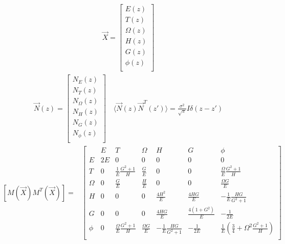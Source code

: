 \begin{align}
\vec{X} = \left[\begin{array}{c}
E(z) \\ 
T(z) \\
\Omega(z)\\
H(z) \\
G(z) \\ 
\phi(z) \\
\end{array}\right]
 \end{align}
\begin{align}
\vec{N}(z) = \left[\begin{array}{c}
N_E(z) \\ 
N_T(z) \\
N_\Omega(z)\\
N_H(z) \\
N_G(z) \\ 
N_\phi(z) \\
\end{array}\right] \quad \langle \vec{N}(z) \vec{N}^T(z')\rangle  = \frac{\sigma^2}{\sqrt{\pi}} I \delta(z-z')
 \end{align}
\begin{align} \left[M(\vec{X})M^{T}(\vec{X})\right] =
&  \left[\begin{array}{c||ccccc|c}
           & E     & T                               & \Omega             &  H                            & G                   & \phi                                                               \\                                   
\hline    \hline                                                                                                                                                                                     
E          & 2E    & 0                               & 0                  &  0                            & 0                   & 0                                                                  \\
T          & 0     & \frac{1}{E}\frac{G^2+1}{H}      & \frac{G}{E}        &  0                            & 0                   & \frac{\Omega}{E}\frac{G^2+1}{H}                                    \\
\Omega     & 0     & \frac{G}{E}                     & \frac{H}{E}        &  0                            & 0                   & \frac{\Omega G}{E}                                                 \\ 
H          & 0     & 0                               & 0                  &  \frac{4H^2}{E}               & \frac{4HG}{E}       & -\frac{1}{E}\frac{HG}{G^2+1}                                       \\
G          & 0     & 0                               & 0                  &  \frac{4HG}{E}                & \frac{4(1+G^2)}{E}  & -\frac{1}{2E}                                                      \\
\hline
\phi       & 0     & \frac{\Omega}{E}\frac{G^2+1}{H} & \frac{\Omega G}{E} &  -\frac{1}{E}\frac{HG}{G^2+1} & -\frac{1}{2E}       & \frac{1}{E} \left(\frac{3}{4}   + \Omega^2 \frac{G^2+1}{H} \right) \\ 
\end{array}\right]
 \end{align}
